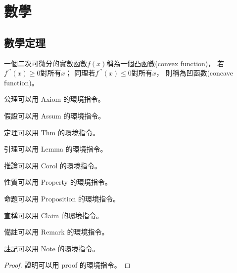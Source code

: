 \documentclass[utf8,12pt]{article} %
\begin{document}
\section{數學}
%
%
\subsection{數學定理}
%
%
\begin{spacing}{1.5}
%
\begin{Def}
	一個二次可微分的實數函數$f\left(x\right)$稱為一個凸函數(convex function)，
	若$f^{\,\prime\prime}\!\left(x\right)\ge0$對所有$x$；
	同理若$f^{\,\prime\prime}\!\left(x\right)\le0$對所有$x$，
	則稱為凹函數(concave function)。
\end{Def}

\begin{Axiom}
	公理可以用 Axiom 的環境指令。
\end{Axiom}

\begin{Assum}
	假設可以用 Assum 的環境指令。
\end{Assum}

\begin{Thm}
	定理可以用 Thm 的環境指令。
\end{Thm}

\begin{Lemma}
	引理可以用 Lemma 的環境指令。
\end{Lemma}

\begin{Corol}
	推論可以用 Corol 的環境指令。
\end{Corol}

\begin{Property}
	性質可以用 Property 的環境指令。
\end{Property}

\begin{Proposition}
	命題可以用 Proposition 的環境指令。
\end{Proposition}

\begin{Claim}
	宣稱可以用 Claim 的環境指令。
\end{Claim}

\begin{Remark}
	備註可以用 Remark 的環境指令。
\end{Remark}

\begin{Note}
	註記可以用 Note 的環境指令。
\end{Note}

\begin{proof}
	證明可以用 proof 的環境指令。
\end{proof}
%
\end{spacing}
%
%
\end{document}
